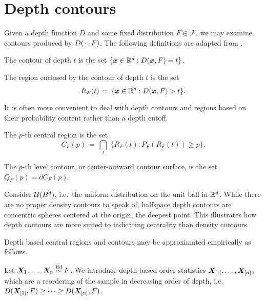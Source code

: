 \section{Depth contours}
\label{sec:multivariate_depthcontours}

Given a depth function $D$ and some fixed distribution $F \in \mathscr{F}$, we
may examine contours produced by $D(\,\cdot\,, F)$.
The following definitions are adapted from \cite{liu-parelius-singh-1999}.

\begin{definition}
    The contour of depth $t$ is the set $\{\bm{x} \in \mathbb{R}^d : D(\bm{x}, F) = t\}$.
\end{definition}

\begin{definition}
    The region enclosed by the contour of depth $t$ is the set
    \begin{equation}
        R_F(t) \,=\, \{\bm{x} \in \mathbb{R}^d : D(\bm{x}, F) > t\}.
    \end{equation}
\end{definition}

It is often more convenient to deal with depth contours and regions based on
their probability content rather than a depth cutoff.

\begin{definition}
    The $p$-th central region is the set
    \begin{equation}
        C_F(p) \,=\, \bigcap_{t}\; \{R_F(t) : P_F(R_F(t)) \geq p\}.
    \end{equation}
\end{definition}

\begin{definition}
    The $p$-th level contour, or center-outward contour surface, is the set
    $Q_F(p) = \partial C_F(p)$.
\end{definition}


\begin{example}
    Consider $\mathcal{U}(B^d)$, i.e.\ the uniform distribution on the unit ball in
    $\mathbb{R}^d$.
    While there are no proper density contours to speak of, halfspace depth
    contours are concentric spheres centered at the origin, the deepest point.
    This illustrates how depth contours are more suited to indicating
    centrality than density contours.
\end{example}


Depth based central regions and contours may be approximated empirically as
follows.

\begin{definition}
    Let $\bm{X}_1, \dots, \bm{X}_n \overset{\text{iid}}{\sim} F$.
    We introduce depth based order statistics $\bm{X}_{[1]}, \dots, \bm{X}_{[n]}$,
    which are a reordering of the sample in decreasing order of depth, i.e.\
    $D(\bm{X}_{[1]}, F) \geq \dots \geq D(\bm{X}_{[n]}, F)$.
\end{definition}

